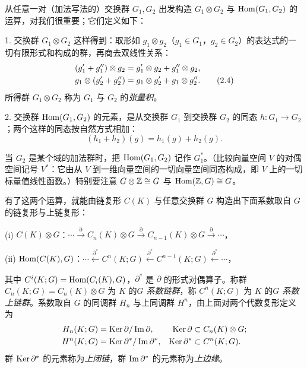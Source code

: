 从任意一对（加法写法的）交换群 $G_1,G_2$ 出发构造 $G_1\otimes G_2$ 与 $\operatorname{Hom}(G_1,G_2)$ 的运算，对我们很重要；它们定义如下：

1. 交换群 $G_1\otimes G_2$ 这样得到：取形如 $g_1\otimes g_2$（$g_1\in G_1$，$g_2\in G_2$）的表达式的一切有限形式和构成的群，再商去双线性关系：
\begin{align}
  (g_1'+g_1'')\otimes g_2 &= g_1'\otimes g_2+g_1''\otimes g_2,\notag\\
  g_1\otimes(g_2'+g_2'') &= g_1\otimes g_2'+g_1\otimes g_2''. \tag{2.4}
\end{align}
所得群 $G_1\otimes G_2$ 称为 $G_1$ 与 $G_2$ 的\emph{张量积}。

2. 交换群 $\operatorname{Hom}(G_1,G_2)$ 的元素，是从交换群 $G_1$ 到交换群 $G_2$ 的同态 $h:G_1\to G_2$；两个这样的同态按自然方式相加：
\begin{equation}
  (h_1+h_2)(g)=h_1(g)+h_2(g). \tag{2.5}
\end{equation}

当 $G_2$ 是某个域的加法群时，把 $\operatorname{Hom}(G_1,G_2)$ 记作 $G_1^*$。（比较向量空间 $V$ 的对偶空间记号 $V^*$：它由从 $V$ 到一维向量空间的一切向量空间同态构成，即 $V$ 上的一切标量值线性函数。）特别要注意 $G\otimes\mathbb{Z}\cong G$ 与 $\operatorname{Hom}(\mathbb{Z},G)\cong G$。

有了这两个运算，就能由链复形 $C(K)$ 与任意交换群 $G$ 构造出下面系数取自 $G$ 的链复形与上链复形：

\noindent (i) $C(K)\otimes G$：$\cdots\xrightarrow{\partial}C_n(K)\otimes G
  \xrightarrow{\partial}C_{n-1}(K)\otimes G\xrightarrow{\partial}\cdots$，

\noindent (ii) $\operatorname{Hom}(C(K),G)$：$\cdots\xleftarrow{\partial^*}C^{n}(K;G)
  \xleftarrow{\partial^*}C^{n-1}(K;G)\xleftarrow{\partial^*}\cdots$，

其中 $C^i(K;G)=\operatorname{Hom}(C_i(K),G)$，$\partial^*$ 是 $\partial$ 的形式对偶算子。称群 $C_n(K;G)=C_n(K)\otimes G$ 为 $K$ 的\emph{$G$ 系数链群}，称 $C^n(K;G)$ 为 $K$ 的\emph{$G$ 系数上链群}。系数取自 $G$ 的同调群 $H_n$ 与上同调群 $H^n$，由上面对两个代数复形定义为
\begin{align*}
  H_n(K;G) &= \operatorname{Ker}\partial/\operatorname{Im}\partial, & \operatorname{Ker}\partial &\subset C_n(K)\otimes G;\\
  H^n(K;G) &= \operatorname{Ker}\partial^*/\operatorname{Im}\partial^*, & \operatorname{Ker}\partial^* &\subset C^n(K;G).
\end{align*}
群 $\operatorname{Ker}\partial^*$ 的元素称为\emph{上闭链}，群 $\operatorname{Im}\partial^*$ 的元素称为\emph{上边缘}。

